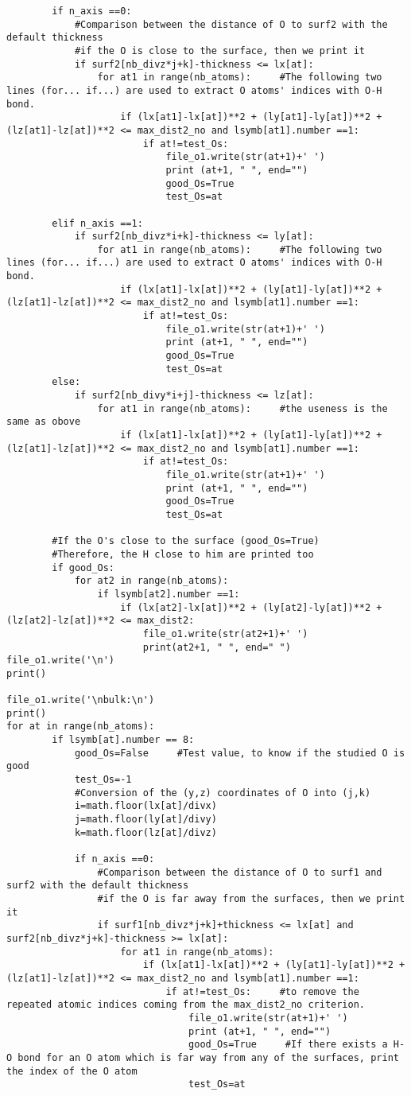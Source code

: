 \begin{lstlisting}
		if n_axis ==0:
			#Comparison between the distance of O to surf2 with the default thickness
			#if the O is close to the surface, then we print it
			if surf2[nb_divz*j+k]-thickness <= lx[at]:
				for at1 in range(nb_atoms):     #The following two lines (for... if...) are used to extract O atoms' indices with O-H bond.
					if (lx[at1]-lx[at])**2 + (ly[at1]-ly[at])**2 +(lz[at1]-lz[at])**2 <= max_dist2_no and lsymb[at1].number ==1:
						if at!=test_Os:
							file_o1.write(str(at+1)+' ')
							print (at+1, " ", end="")
							good_Os=True
							test_Os=at

		elif n_axis ==1:
			if surf2[nb_divz*i+k]-thickness <= ly[at]:
				for at1 in range(nb_atoms):     #The following two lines (for... if...) are used to extract O atoms' indices with O-H bond.
					if (lx[at1]-lx[at])**2 + (ly[at1]-ly[at])**2 +(lz[at1]-lz[at])**2 <= max_dist2_no and lsymb[at1].number ==1:
						if at!=test_Os:
							file_o1.write(str(at+1)+' ')
							print (at+1, " ", end="")
							good_Os=True
							test_Os=at
		else:
			if surf2[nb_divy*i+j]-thickness <= lz[at]:
				for at1 in range(nb_atoms):     #the useness is the same as obove 
					if (lx[at1]-lx[at])**2 + (ly[at1]-ly[at])**2 +(lz[at1]-lz[at])**2 <= max_dist2_no and lsymb[at1].number ==1:
						if at!=test_Os:
							file_o1.write(str(at+1)+' ')
							print (at+1, " ", end="")
							good_Os=True
							test_Os=at

		#If the O's close to the surface (good_Os=True)
		#Therefore, the H close to him are printed too             
		if good_Os:
			for at2 in range(nb_atoms):                                    
				if lsymb[at2].number ==1: 
					if (lx[at2]-lx[at])**2 + (ly[at2]-ly[at])**2 +(lz[at2]-lz[at])**2 <= max_dist2:                                                                
						file_o1.write(str(at2+1)+' ')
						print(at2+1, " ", end=" ")
file_o1.write('\n')
print()

file_o1.write('\nbulk:\n')
print()
for at in range(nb_atoms):
		if lsymb[at].number == 8:
			good_Os=False     #Test value, to know if the studied O is good 
			test_Os=-1
			#Conversion of the (y,z) coordinates of O into (j,k)
			i=math.floor(lx[at]/divx)
			j=math.floor(ly[at]/divy)
			k=math.floor(lz[at]/divz)
	
			if n_axis ==0:
				#Comparison between the distance of O to surf1 and surf2 with the default thickness
				#if the O is far away from the surfaces, then we print it
				if surf1[nb_divz*j+k]+thickness <= lx[at] and surf2[nb_divz*j+k]-thickness >= lx[at]:
					for at1 in range(nb_atoms):
						if (lx[at1]-lx[at])**2 + (ly[at1]-ly[at])**2 +(lz[at1]-lz[at])**2 <= max_dist2_no and lsymb[at1].number ==1:
							if at!=test_Os:     #to remove the repeated atomic indices coming from the max_dist2_no criterion. 
								file_o1.write(str(at+1)+' ')
								print (at+1, " ", end="")
								good_Os=True     #If there exists a H-O bond for an O atom which is far way from any of the surfaces, print the index of the O atom
								test_Os=at


\end{lstlisting}

